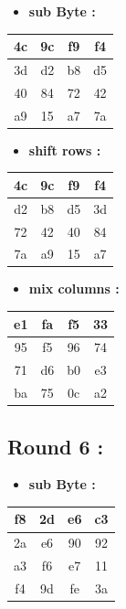 \documentclass{article}
\begin{document}
\begin{itemize}
    \item \textbf{sub Byte :}
\end{itemize} \begin{tabular}{|c|c|c|c|}
\hline 4c & 9c & f9 & f4 \\ \hline 3d & d2 & b8 & d5 \\ \hline 40 & 84 & 72 & 42 \\ \hline a9 & 15 & a7 & 7a \\ \hline \end{tabular}\hspace{0.5cm}\vspace{0.1cm}\begin{itemize}
    \item \textbf{shift rows :}
\end{itemize} \begin{tabular}{|c|c|c|c|}
\hline 4c & 9c & f9 & f4 \\ \hline d2 & b8 & d5 & 3d \\ \hline 72 & 42 & 40 & 84 \\ \hline 7a & a9 & 15 & a7 \\ \hline \end{tabular}\hspace{0.5cm}\vspace{0.1cm}\begin{itemize}
    \item \textbf{mix columns :}
\end{itemize} \begin{tabular}{|c|c|c|c|}
\hline e1 & fa & f5 & 33 \\ \hline 95 & f5 & 96 & 74 \\ \hline 71 & d6 & b0 & e3 \\ \hline ba & 75 & 0c & a2 \\ \hline \end{tabular}\hspace{0.5cm}\vspace{0.1cm}\subsection*{Round 6 : }\begin{itemize}
    \item \textbf{sub Byte :}
\end{itemize} \begin{tabular}{|c|c|c|c|}
\hline f8 & 2d & e6 & c3 \\ \hline 2a & e6 & 90 & 92 \\ \hline a3 & f6 & e7 & 11 \\ \hline f4 & 9d & fe & 3a \\ \hline \end{tabular}\hspace{0.5cm}\vspace{0.1cm}\begin{itemize}

\end{itemize}
\end{document}
